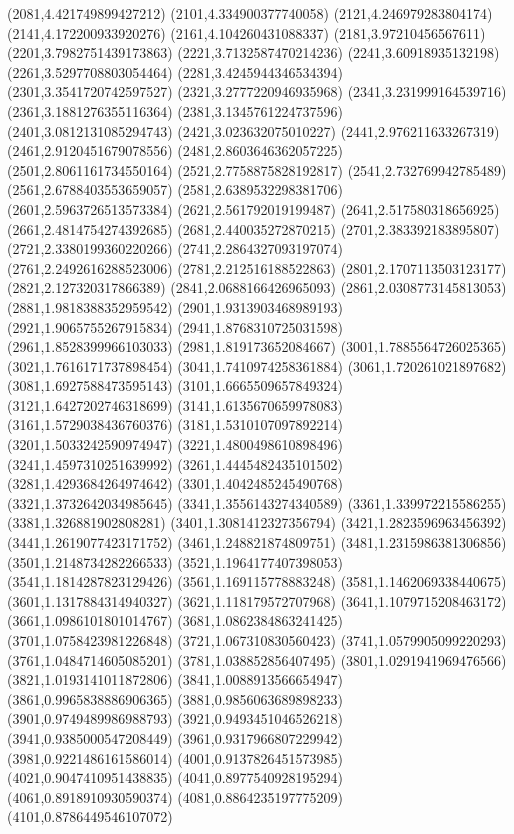 {(2081,4.421749899427212)
(2101,4.334900377740058)
(2121,4.246979283804174)
(2141,4.172200933920276)
(2161,4.104260431088337)
(2181,3.97210456567611)
(2201,3.7982751439173863)
(2221,3.7132587470214236)
(2241,3.60918935132198)
(2261,3.5297708803054464)
(2281,3.4245944346534394)
(2301,3.3541720742597527)
(2321,3.2777220946935968)
(2341,3.231999164539716)
(2361,3.1881276355116364)
(2381,3.1345761224737596)
(2401,3.0812131085294743)
(2421,3.023632075010227)
(2441,2.976211633267319)
(2461,2.9120451679078556)
(2481,2.8603646362057225)
(2501,2.8061161734550164)
(2521,2.7758875828192817)
(2541,2.732769942785489)
(2561,2.6788403553659057)
(2581,2.6389532298381706)
(2601,2.5963726513573384)
(2621,2.561792019199487)
(2641,2.517580318656925)
(2661,2.4814754274392685)
(2681,2.440035272870215)
(2701,2.383392183895807)
(2721,2.3380199360220266)
(2741,2.2864327093197074)
(2761,2.2492616288523006)
(2781,2.212516188522863)
(2801,2.1707113503123177)
(2821,2.127320317866389)
(2841,2.0688166426965093)
(2861,2.0308773145813053)
(2881,1.9818388352959542)
(2901,1.9313903468989193)
(2921,1.9065755267915834)
(2941,1.8768310725031598)
(2961,1.8528399966103033)
(2981,1.819173652084667)
(3001,1.7885564726025365)
(3021,1.7616171737898454)
(3041,1.7410974258361884)
(3061,1.720261021897682)
(3081,1.6927588473595143)
(3101,1.6665509657849324)
(3121,1.6427202746318699)
(3141,1.6135670659978083)
(3161,1.5729038436760376)
(3181,1.5310107097892214)
(3201,1.5033242590974947)
(3221,1.4800498610898496)
(3241,1.4597310251639992)
(3261,1.4445482435101502)
(3281,1.4293684264974642)
(3301,1.4042485245490768)
(3321,1.3732642034985645)
(3341,1.3556143274340589)
(3361,1.339972215586255)
(3381,1.326881902808281)
(3401,1.3081412327356794)
(3421,1.2823596963456392)
(3441,1.2619077423171752)
(3461,1.248821874809751)
(3481,1.2315986381306856)
(3501,1.2148734282266533)
(3521,1.1964177407398053)
(3541,1.1814287823129426)
(3561,1.169115778883248)
(3581,1.1462069338440675)
(3601,1.1317884314940327)
(3621,1.118179572707968)
(3641,1.1079715208463172)
(3661,1.0986101801014767)
(3681,1.0862384863241425)
(3701,1.0758423981226848)
(3721,1.067310830560423)
(3741,1.0579905099220293)
(3761,1.0484714605085201)
(3781,1.038852856407495)
(3801,1.0291941969476566)
(3821,1.0193141011872806)
(3841,1.0088913566654947)
(3861,0.9965838886906365)
(3881,0.9856063689898233)
(3901,0.9749489986988793)
(3921,0.9493451046526218)
(3941,0.9385000547208449)
(3961,0.9317966807229942)
(3981,0.9221486161586014)
(4001,0.9137826451573985)
(4021,0.9047410951438835)
(4041,0.8977540928195294)
(4061,0.8918910930590374)
(4081,0.8864235197775209)
(4101,0.8786449546107072)
}
